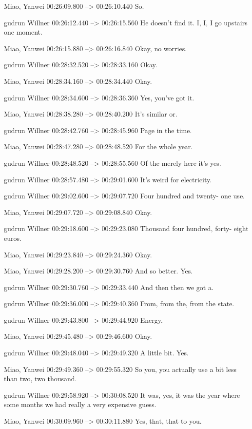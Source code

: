 {Miao, Yanwei 00:26:09.800 --> 00:26:10.440
So.

gudrun Willner 00:26:12.440 --> 00:26:15.560
He doesn't find it. I, I, I go upstairs one moment.

Miao, Yanwei 00:26:15.880 --> 00:26:16.840
Okay, no worries.

gudrun Willner 00:28:32.520 --> 00:28:33.160
Okay.

Miao, Yanwei 00:28:34.160 --> 00:28:34.440
Okay.

gudrun Willner 00:28:34.600 --> 00:28:36.360
Yes, you've got it.

Miao, Yanwei 00:28:38.280 --> 00:28:40.200
It's similar or.

gudrun Willner 00:28:42.760 --> 00:28:45.960
Page in the time.

Miao, Yanwei 00:28:47.280 --> 00:28:48.520
For the whole year.

gudrun Willner 00:28:48.520 --> 00:28:55.560
Of the merely here it's yes.

gudrun Willner 00:28:57.480 --> 00:29:01.600
It's weird for electricity.

gudrun Willner 00:29:02.600 --> 00:29:07.720
Four hundred and twenty- one use.

Miao, Yanwei 00:29:07.720 --> 00:29:08.840
Okay.

gudrun Willner 00:29:18.600 --> 00:29:23.080
Thousand four hundred, forty- eight euros.

Miao, Yanwei 00:29:23.840 --> 00:29:24.360
Okay.

Miao, Yanwei 00:29:28.200 --> 00:29:30.760
And so better. Yes.

gudrun Willner 00:29:30.760 --> 00:29:33.440
And then then we got a.

gudrun Willner 00:29:36.000 --> 00:29:40.360
From, from the, from the state.

gudrun Willner 00:29:43.800 --> 00:29:44.920
Energy.

Miao, Yanwei 00:29:45.480 --> 00:29:46.600
Okay.

gudrun Willner 00:29:48.040 --> 00:29:49.320
A little bit. Yes.

Miao, Yanwei 00:29:49.360 --> 00:29:55.320
So you, you actually use a bit less than two, two thousand.

gudrun Willner 00:29:58.920 --> 00:30:08.520
It was, yes, it was the year where some months we had really a very expensive guess.

Miao, Yanwei 00:30:09.960 --> 00:30:11.880
Yes, that, that to you.

}
